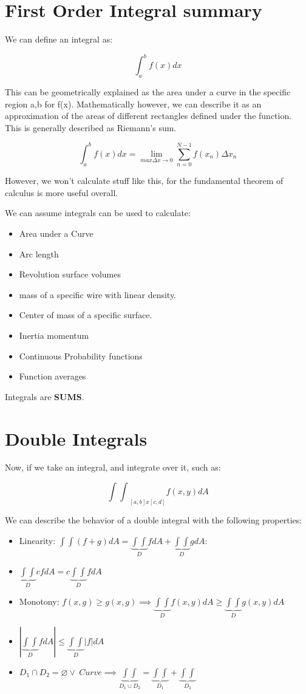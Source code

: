 \documentclass[11pt,fleqn]{book} %
\begin{document}
\section{First Order Integral summary}

We can define an integral as:

$$\int_a^b f(x) dx$$

This can be geometrically explained as the area under a curve in the specific region
a,b for f(x). Mathematically however, we can describe it as an approximation of
the areas of different rectangles defined under the function. This is generally described
as Riemann's sum. 

$$\int_a^b f(x) dx = \lim_{max \Delta x \to 0} \sum_{n = 0}^{N-1} f(x_n) \Delta x_n $$

However, we won't calculate stuff like this, for the fundamental theorem of calculus is more useful overall.

We can assume integrals can be used to calculate:
\begin{itemize}
    \item Area under a Curve
    \item Arc length
    \item Revolution surface volumes
    \item mass of a specific wire with linear density.
    \item Center of mass of a specific surface.
    \item Inertia momentum
    \item Continuous Probability functions
    \item Function averages
\end{itemize}

Integrals are \textbf{SUMS}. 

\section{Double Integrals}

Now, if we take an integral, and integrate over it, such as:

$${\int\int}_{[a,b] x [c,d]} f(x,y) dA$$

We can describe the behavior of a double integral with the following properties:

\begin{itemize}
    \item Linearity: $\int \int (f+g) d A = \underbrace{\int \int}_{D} fdA + \underbrace{\int \int}_{D} gdA$:
    \item $\underbrace{\int \int}_{D} c fdA = c \underbrace{\int \int}_{D} fdA$
    \item Monotony: $f(x,g) \geq g(x,g) \implies \underbrace{\int \int}_{D} f(x,y)dA \geq \underbrace{\int \int}_{D} g(x,y)dA$
    \item $|\underbrace{\int \int}_{D} f dA| \leq \underbrace{\int \int}_{D} |f| dA$
    \item $D_1 \cap D_2 = \varnothing \lor \ Curve \implies \underbrace{\int \int}_{D_1 \cup D_2} = \underbrace{\int \int}_{D_1} + \underbrace{\int \int}_{D_2} $ 
\end{itemize}
\end{document}
